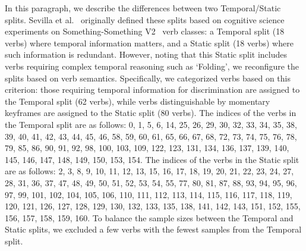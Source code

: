In this paragraph, we describe the differences between two Temporal/Static splits.
Sevilla et al.~\cite{laura2021temporal} originally defined these splits based on cognitive science experiments on Something-Something V2~\cite{goyal2017something} verb classes: a Temporal split (18 verbs) where temporal information matters, and a Static split (18 verbs) where such information is redundant. 
However, noting that this Static split includes verbs requiring complex temporal reasoning such as `Folding', we reconfigure the splits based on verb semantics. 
Specifically, we categorized verbs based on this criterion: those requiring temporal information for discrimination are assigned to the Temporal split (62 verbs), while verbs distinguishable by momentary keyframes are assigned to the Static split (80 verbs).
The indices of the verbs in the Temporal split are as follows: 0, 1, 5, 6, 14, 25, 26, 29, 30, 32, 33, 34, 35, 38, 39, 40, 41, 42, 43, 44, 45, 46, 58, 59, 60, 61, 65, 66, 67, 68, 72, 73, 74, 75, 76, 78, 79, 85, 86, 90, 91, 92, 98, 100, 103, 109, 122, 123, 131, 134, 136, 137, 139, 140, 145, 146, 147, 148, 149, 150, 153, 154.
The indices of the verbs in the Static split are as follows: 2, 3, 8, 9, 10, 11, 12, 13, 15, 16, 17, 18, 19, 20, 21, 22, 23, 24, 27, 28, 31, 36, 37, 47, 48, 49, 50, 51, 52, 53, 54, 55, 77, 80, 81, 87, 88, 93, 94, 95, 96, 97, 99, 101, 102, 104, 105, 106, 110, 111, 112, 113, 114, 115, 116, 117, 118, 119, 120, 121, 126, 127, 128, 129, 130, 132, 133, 135, 138, 141, 142, 143, 151, 152, 155, 156, 157, 158, 159, 160.
To balance the sample sizes between the Temporal and Static splits, we excluded a few verbs with the fewest samples from the Temporal split.
